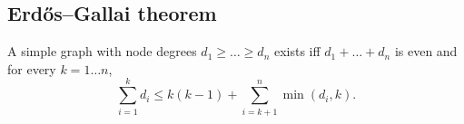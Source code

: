 	\subsection{Erdős–Gallai theorem}
		A simple graph with node degrees $d_1 \ge \dots \ge d_n$ exists iff $d_1 + \dots + d_n$ is even and for every $k = 1\dots n$,
		\[ \sum _{i=1}^{k}d_{i}\leq k(k-1)+\sum _{i=k+1}^{n}\min(d_{i},k). \]
